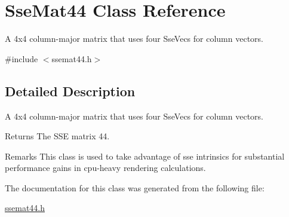 \hypertarget{class_sse_mat44}{}\section{Sse\+Mat44 Class Reference}
\label{class_sse_mat44}


A 4x4 column-\/major matrix that uses four Sse\+Vecs for column vectors.  




{\ttfamily \#include $<$ssemat44.\+h$>$}



\subsection{Detailed Description}
A 4x4 column-\/major matrix that uses four Sse\+Vecs for column vectors. 

\begin{DoxyReturn}{Returns}
The S\+S\+E matrix 44.
\end{DoxyReturn}
\begin{DoxyRemark}{Remarks}
This class is used to take advantage of sse intrinsics for substantial performance gains in cpu-\/heavy rendering calculations. 
\end{DoxyRemark}


The documentation for this class was generated from the following file\+:\begin{DoxyCompactItemize}
\item 
\hyperlink{ssemat44_8h}{ssemat44.\+h}\end{DoxyCompactItemize}
